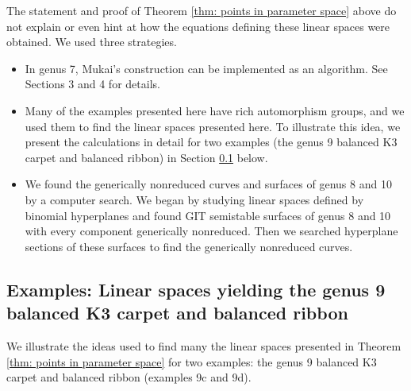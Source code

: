 \documentclass{amsart}[12pt]
\theoremstyle{definition}
\numberwithin{equation}{section}
\begin{document}
The statement and proof of Theorem \ref{thm: points in parameter
  space} above do not explain or even hint at how the equations defining these
linear spaces were obtained. We used three strategies.

\begin{itemize}
\item In genus 7, Mukai's construction can be implemented as an
  algorithm. See \cite{Swinarski2025} Sections 3 and 4 for details.
\item Many of the examples presented here have rich automorphism
  groups, and we used them to find the linear spaces presented
  here. To illustrate this idea, we present the calculations in detail for
two examples (the genus 9 balanced K3 carpet and balanced ribbon) in Section \ref{subsec:ribbon} below. 
\item We found the generically nonreduced curves and surfaces of genus 8
  and 10 by a computer search. We began by studying linear spaces defined by binomial hyperplanes and found GIT semistable surfaces of genus 8 and 10 with every component generically nonreduced. Then we searched hyperplane sections of these surfaces to find the generically nonreduced curves.
\end{itemize}



\subsection{Examples: Linear spaces yielding the genus 9 balanced K3 carpet and balanced ribbon}\label{subsec:ribbon}

We illustrate the ideas used to find many the linear spaces presented in Theorem \ref{thm: points in parameter
  space} for two examples: the genus 9
balanced K3 carpet and balanced ribbon (examples 9c and 9d). 
\end{document}
